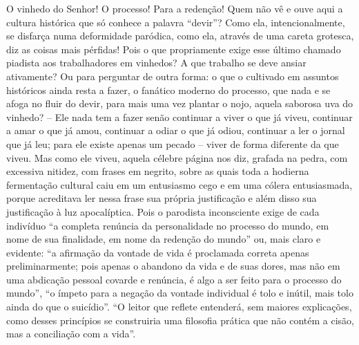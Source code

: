     O vinhedo do Senhor! O processo! Para a redenção! Quem não vê e ouve
    aqui a cultura histórica que só conhece a palavra ``devir''? Como
    ela, intencionalmente, se disfarça numa deformidade paródica, como
    ela, através de uma careta grotesca, diz as coisas mais pérfidas!
    Pois o que propriamente exige esse último chamado piadista aos
    trabalhadores em vinhedos? A que trabalho se deve ansiar ativamente?
    Ou para perguntar de outra forma: o que o cultivado em assuntos
    históricos ainda resta a fazer, o fanático moderno do processo, que
    nada e se afoga no fluir do devir, para mais uma vez plantar o nojo,
    aquela saborosa uva do vinhedo? -- Ele nada tem a fazer senão
    continuar a viver o que já viveu, continuar a amar o que já amou,
    continuar a odiar o que já odiou, continuar a ler o jornal que já
    leu; para ele existe apenas um pecado -- viver de forma diferente da
    que viveu. Mas como ele viveu, aquela célebre página nos diz,
    grafada na pedra, com excessiva nitidez, com frases em negrito,
    sobre as quais toda a hodierna fermentação cultural caiu em um
    entusiasmo cego e em uma cólera entusiasmada, porque acreditava ler
    nessa frase sua própria justificação e além disso sua justificação à
    luz apocalíptica. Pois o parodista inconsciente exige de cada
    indivíduo ``a completa renúncia da personalidade no processo do
    mundo, em nome de sua finalidade, em nome da redenção do mundo''
    ou, mais claro e evidente: ``a afirmação da vontade de vida é
    proclamada correta apenas preliminarmente; pois apenas o abandono da
    vida e de suas dores, mas não em uma abdicação pessoal covarde e
    renúncia, é algo a ser feito para o processo do mundo'', ``o ímpeto
    para a negação da vontade individual é tolo e inútil, mais tolo
    ainda do que o suicídio''. ``O leitor que reflete entenderá, sem
    maiores explicações, como desses princípios se construiria uma
    filosofia prática que não contém a cisão, mas a conciliação com a
    vida''.

